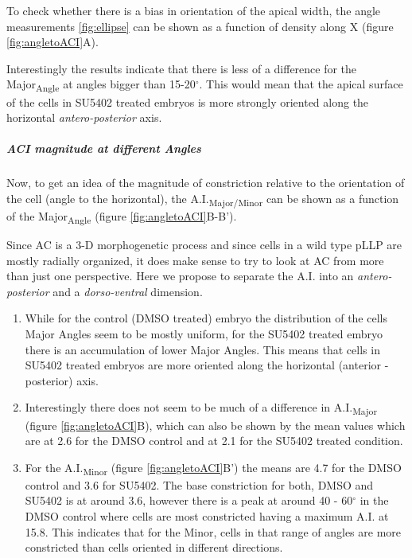 \documentclass[11pt,singlespacinge,twoside]{reedthesis} %
\theoremstyle{definition}
\theoremstyle{definition}
\theoremstyle{definition}
\theoremstyle{remark}
\begin{document}
To check whether there is a bias in orientation of the apical width, the angle measurements \ref{fig:ellipse} can be shown as a function of density along X (figure \ref{fig:angletoACI}A).

Interestingly the results indicate that there is less of a difference for the Major\textsubscript{Angle} at angles bigger than 15-20\(^\circ\). This would mean that the apical surface of the cells in SU5402 treated embryos is more strongly oriented along the horizontal \emph{antero-posterior} axis.

\hypertarget{ACI-mag}{%
\subparagraph{ACI magnitude at different Angles}\label{ACI-mag}}

Now, to get an idea of the magnitude of constriction relative to the orientation of the cell (angle to the horizontal), the A.I.\textsubscript{Major/Minor} can be shown as a function of the Major\textsubscript{Angle} (figure \ref{fig:angletoACI}B-B').

\noindent Since AC is a 3-D morphogenetic process and since cells in a wild type pLLP are mostly radially organized, it does make sense to try to look at AC from more than just one perspective. Here we propose to separate the A.I. into an \emph{antero-posterior} and a \emph{dorso-ventral} dimension.
\begin{enumerate}
\def\labelenumi{\arabic{enumi}.}
\item
  While for the control (DMSO treated) embryo the distribution of the cells Major Angles seem to be mostly uniform, for the SU5402 treated embryo there is an accumulation of lower Major Angles. This means that cells in SU5402 treated embryos are more oriented along the horizontal (anterior - posterior) axis.
\item
  Interestingly there does not seem to be much of a difference in A.I.\textsubscript{Major} (figure \ref{fig:angletoACI}B), which can also be shown by the mean values which are at 2.6 for the DMSO control and at 2.1 for the SU5402 treated condition.
\item
  For the A.I.\textsubscript{Minor} (figure \ref{fig:angletoACI}B') the means are 4.7 for the DMSO control and 3.6 for SU5402. The base constriction for both, DMSO and SU5402 is at around 3.6, however there is a peak at around 40 - 60\(^\circ\) in the DMSO control where cells are most constricted having a maximum A.I. at 15.8. This indicates that for the Minor, cells in that range of angles are more constricted than cells oriented in different directions.
\end{enumerate}
\end{document}
